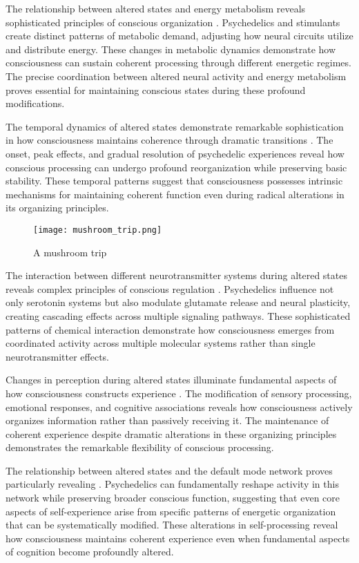 The relationship between altered states and energy metabolism reveals sophisticated principles of conscious organization \cite{Vaitl2005}. Psychedelics and stimulants create distinct patterns of metabolic demand, adjusting how neural circuits utilize and distribute energy. These changes in metabolic dynamics demonstrate how consciousness can sustain coherent processing through different energetic regimes. The precise coordination between altered neural activity and energy metabolism proves essential for maintaining conscious states during these profound modifications.

The temporal dynamics of altered states demonstrate remarkable sophistication in how consciousness maintains coherence through dramatic transitions \cite{Vollenweider2020}. The onset, peak effects, and gradual resolution of psychedelic experiences reveal how conscious processing can undergo profound reorganization while preserving basic stability. These temporal patterns suggest that consciousness possesses intrinsic mechanisms for maintaining coherent function even during radical alterations in its organizing principles.

\begin{figure}[h]
    \centering
    \texttt{[image: mushroom\_trip.png]}

    \caption{A mushroom trip}
\end{figure}

The interaction between different neurotransmitter systems during altered states reveals complex principles of conscious regulation \cite{Ludwig1966}. Psychedelics influence not only serotonin systems but also modulate glutamate release and neural plasticity, creating cascading effects across multiple signaling pathways. These sophisticated patterns of chemical interaction demonstrate how consciousness emerges from coordinated activity across multiple molecular systems rather than single neurotransmitter effects.

Changes in perception during altered states illuminate fundamental aspects of how consciousness constructs experience \cite{Dittrich2010}. The modification of sensory processing, emotional responses, and cognitive associations reveals how consciousness actively organizes information rather than passively receiving it. The maintenance of coherent experience despite dramatic alterations in these organizing principles demonstrates the remarkable flexibility of conscious processing.

The relationship between altered states and the default mode network proves particularly revealing \cite{CarhartHarris2019}. Psychedelics can fundamentally reshape activity in this network while preserving broader conscious function, suggesting that even core aspects of self-experience arise from specific patterns of energetic organization that can be systematically modified. These alterations in self-processing reveal how consciousness maintains coherent experience even when fundamental aspects of cognition become profoundly altered.

